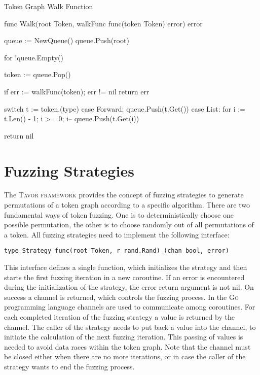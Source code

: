 \begin{listing}
\caption{Token Graph Walk Function}
\label{lst:walk-func}
\begin{gocode}
func Walk(root Token, walkFunc func(token Token) error) error {
	queue := NewQueue()
	queue.Push(root)

	for !queue.Empty() {
		token := queue.Pop()

		if err := walkFunc(token); err != nil {
			return err
		}

		switch t := token.(type) {
		case Forward:
			queue.Push(t.Get())
		case List:
			for i := t.Len() - 1; i >= 0; i-- {
				queue.Push(t.Get(i))
			}
		}
	}

	return nil
}
\end{gocode}
\end{listing}

\section{Fuzzing Strategies}
\label{sec:fuzzingStrategies}

The \textsc{Tavor framework} provides the concept of fuzzing strategies to generate permutations of a token graph according to a specific algorithm. There are two fundamental ways of token fuzzing. One is to deterministically choose one possible permutation, the other is to choose randomly out of all permutations of a token. All fuzzing strategies need to implement the following interface:

\begin{center} \texttt{type Strategy func(root Token, r rand.Rand) (chan bool, error)} \end{center}

This interface defines a single function, which initializes the strategy and then starts the first fuzzing iteration in a new coroutine. If an error is encountered during the initialization of the strategy, the error return argument is not nil. On success a channel is returned, which controls the fuzzing process. In the \textsc{Go} programming language channels are used to communicate among coroutines. For each completed iteration of the fuzzing strategy a value is returned by the channel. The caller of the strategy needs to put back a value into the channel, to initiate the calculation of the next fuzzing iteration. This passing of values is needed to avoid data races within the token graph. Note that the channel must be closed either when there are no more iterations, or in case the caller of the strategy wants to end the fuzzing process.

